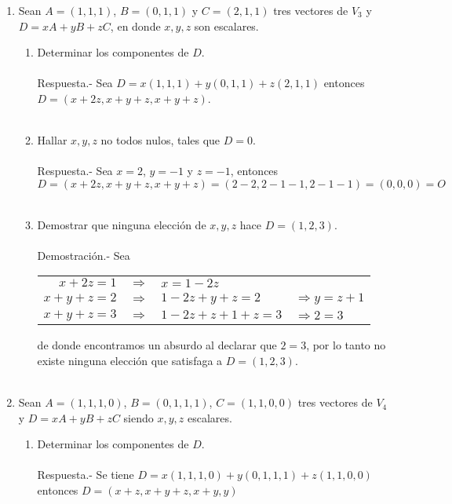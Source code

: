 \begin{enumerate}[\bfseries 1.]
\begin{enumerate}[\bfseries a)]
\end{enumerate}

\item Sean $A=(1,1,1)$, $B=(0,1,1)$ y $C=(2,1,1)$ tres vectores de $V_3$ y $D=xA+yB+zC$, en donde $x,y,z$ son escalares.
\begin{enumerate}[\bfseries a)]

    \item Determinar los componentes de $D$.\\\\
	Respuesta.-\; Sea $D=x(1,1,1)+y(0,1,1)+z(2,1,1)$ entonces $D=(x+2z,x+y+z,x+y+z)$.\\\\


    \item Hallar $x,y,z$ no todos nulos, tales que $D=0$.\\\\
	Respuesta.-\; Sea $x=2$, $y=-1$ y $z=-1$, entonces $$D=(x+2z,x+y+z,x+y+z)=(2-2,2-1-1,2-1-1)=(0,0,0)=O$$ \\

    \item Demostrar que ninguna elección de $x,y,z$ hace $D=(1,2,3)$.\\\\
	Demostración.-\; Sea 
	\begin{center}
	    \begin{tabular}{rcll}
		$x+2z=1$&$\Longrightarrow$&$x=1-2z$&\\
		$x+y+z=2$&$\Longrightarrow$&$1-2z+y+z=2$&$\Longrightarrow y=z+1$\\
		$x+y+z=3$&$\Longrightarrow$&$1-2z+z+1+z=3$&$\Longrightarrow 2=3$\\
	    \end{tabular}
	\end{center}
	de donde encontramos un absurdo al declarar que $2=3$, por lo tanto no existe ninguna elección que satisfaga a $D=(1,2,3)$.\\\\

\end{enumerate}

\item Sean $A=(1,1,1,0)$, $B=(0,1,1,1)$, $C=(1,1,0,0)$ tres vectores de $V_4$ y $D=xA+yB+zC$ siendo $x,y,z$ escalares.
\begin{enumerate}[\bfseries a)]

    \item Determinar los componentes de $D$.\\\\
	Respuesta.-\; Se tiene $D=x(1,1,1,0)+y(0,1,1,1)+z(1,1,0,0)$ entonces $D=(x+z,x+y+z,x+y,y)$\\\\


\end{enumerate}
\end{enumerate}
